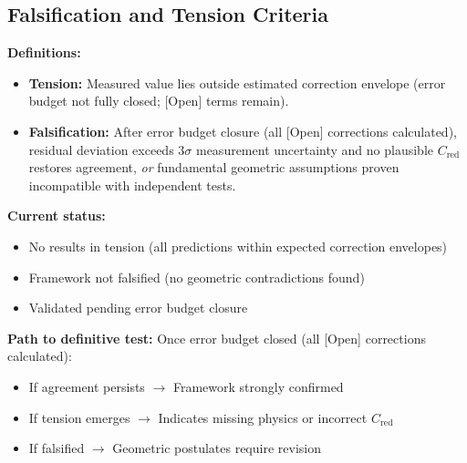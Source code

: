 
\subsection*{Falsification and Tension Criteria}

\textbf{Definitions:}

\begin{itemize}
\item \textbf{Tension:} Measured value lies outside estimated correction envelope 
  (error budget not fully closed; [Open] terms remain).

\item \textbf{Falsification:} After error budget closure (all [Open] corrections calculated), 
  residual deviation exceeds $3\sigma$ measurement uncertainty and no plausible 
  $C_{\mathrm{red}}$ restores agreement, \textit{or} fundamental geometric assumptions 
  proven incompatible with independent tests.
\end{itemize}

\textbf{Current status:}
\begin{itemize}
\item No results in tension (all predictions within expected correction envelopes)
\item Framework not falsified (no geometric contradictions found)
\item Validated pending error budget closure
\end{itemize}

\textbf{Path to definitive test:}
Once error budget closed (all [Open] corrections calculated):
\begin{itemize}
\item If agreement persists $\to$ Framework strongly confirmed
\item If tension emerges $\to$ Indicates missing physics or incorrect $C_{\mathrm{red}}$
\item If falsified $\to$ Geometric postulates require revision
\end{itemize}

